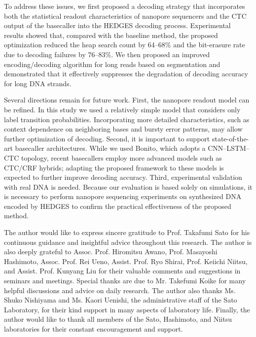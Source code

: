 \documentclass[sotsuron]{kuee}
\begin{document}
To address these issues, we first proposed a decoding strategy that incorporates both the statistical readout
characteristics of nanopore sequencers and the CTC output of the basecaller into the HEDGES decoding process.
Experimental results showed that, compared with the baseline method, the proposed optimization reduced the
heap search count by 64--68\% and the bit-erasure rate due to decoding failures by 76--83\%.
We then proposed an improved encoding/decoding algorithm for long reads based on segmentation and demonstrated
that it effectively suppresses the degradation of decoding accuracy for long DNA strands.

Several directions remain for future work.
First, the nanopore readout model can be refined.
In this study we used a relatively simple model that considers only label transition probabilities.
Incorporating more detailed characteristics, such as context dependence on neighboring bases and bursty error
patterns, may allow further optimization of decoding.
Second, it is important to support state-of-the-art basecaller architectures.
While we used Bonito, which adopts a CNN--LSTM--CTC topology, recent basecallers employ more advanced models
such as CTC/CRF hybrids; adapting the proposed framework to these models is expected to further improve
decoding accuracy.
Third, experimental validation with real DNA is needed.
Because our evaluation is based solely on simulations, it is necessary to perform nanopore sequencing
experiments on synthesized DNA encoded by HEDGES to confirm the practical effectiveness of the proposed method.


\begin{acknowledgements}
The author would like to express sincere gratitude to Prof. Takafumi Sato for his
continuous guidance and insightful advice throughout this research.
The author is also deeply grateful to Assoc. Prof. Hiromitsu Awano, Prof. Masayoshi Hashimoto,
Assoc. Prof. Rei Ueno, Assist. Prof. Ryo Shirai, Prof. Keiichi Niitsu, and Assist. Prof. Kunyang Liu
for their valuable comments and suggestions in seminars and meetings.
Special thanks are due to Mr. Takefumi Koike for many helpful discussions and advice on daily research.
The author also thanks Ms. Shuko Nishiyama and Ms. Kaori Uenishi, the administrative staff of the Sato Laboratory,
for their kind support in many aspects of laboratory life.
Finally, the author would like to thank all members of the Sato, Hashimoto, and Niitsu laboratories
for their constant encouragement and support.
\end{acknowledgements}
\end{document}

